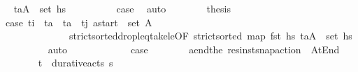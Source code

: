 \begin{isabellebody}
\ \isamarkupfalse%
\ {\isachardoublequoteopen}{\isacharparenleft}{\kern0pt}t\isactrlsub a{\isacharcomma}{\kern0pt}A{\isacharprime}{\kern0pt}{\isacharparenright}{\kern0pt}\ {\isasymin}\ set\ hs\isanewline
\ \ \ \ \ \ \ \ \isamarkupfalse%
\ {\isacartoucheopen}{\isacharquery}{\kern0pt}case{}{\isacartoucheclose}\ \isamarkupfalse%
\ auto\isanewline
\ \ \ \ \ \ \isamarkupfalse%
\ {\isacharquery}{\kern0pt}thesis\isanewline
\ \ \ \ \ \ \ \ \isamarkupfalse%
\ {\isacartoucheopen}{\isacharquery}{\kern0pt}case{}{\isacartoucheclose}\ {\isacartoucheopen}t\isactrlsub i\ {\isacharless}{\kern0pt}\ t\isactrlsub a\ {\isasymand}\ t\isactrlsub a\ {\isacharless}{\kern0pt}\ t\isactrlsub j{\isacartoucheclose}\ {\isacartoucheopen}{\isacharquery}{\kern0pt}a\isactrlsub s\isactrlsub t\isactrlsub a\isactrlsub r\isactrlsub t\ {\isasymin}\ set\ A{\isacharprime}{\kern0pt}{\isacartoucheclose}\isanewline
\ \ \ \ \ \ \ \ \ \ \ \ \ \ strict{\isacharunderscore}{\kern0pt}sorted{\isacharunderscore}{\kern0pt}drop{\isacharunderscore}{\kern0pt}leq{\isacharunderscore}{\kern0pt}take{\isacharunderscore}{\kern0pt}le{\isacharbrackleft}{\kern0pt}OF\ {\isacartoucheopen}strict{\isacharunderscore}{\kern0pt}sorted\ {\isacharparenleft}{\kern0pt}map\ fst\ hs\ {\isacartoucheopen}{\isacharparenleft}{\kern0pt}t\isactrlsub a{\isacharcomma}{\kern0pt}A{\isacharprime}{\kern0pt}{\isacharparenright}{\kern0pt}\ {\isasymin}\ set\ hs\isanewline
\ \ \ \ \ \ \ \ \isamarkupfalse%
\ auto\isanewline
\ \ \ \ \isamarkupfalse%
\isanewline
\ \ \ \ \ \ \isamarkupfalse%
\ {\isacharquery}{\kern0pt}case{}\isanewline
\ \ \ \ \ \ \isamarkupfalse%
\ {\isacharquery}{\kern0pt}a\isactrlsub e\isactrlsub n\isactrlsub d{\isacharequal}{\kern0pt}{\isachardoublequoteopen}the\ {\isacharparenleft}{\kern0pt}res{\isacharunderscore}{\kern0pt}inst{\isacharunderscore}{\kern0pt}snap{\isacharunderscore}{\kern0pt}action\ {\isasympi}\ At{\isacharunderscore}{\kern0pt}End{\isacharparenright}{\kern0pt}{\isachardoublequoteclose}\isanewline
\ \ \ \ \ \ \isamarkupfalse%
\ {\isachardoublequoteopen}{\isacharparenleft}{\kern0pt}t\isactrlsub {\isasympi}{\isacharcomma}{\kern0pt}{\isasympi}{\isacharparenright}{\kern0pt}\ {\isasymin}\ durative{\isacharunderscore}{\kern0pt}acts\ {\isasympi}s{\isachardoublequoteclose}\isanewline

\end{isabellebody}
